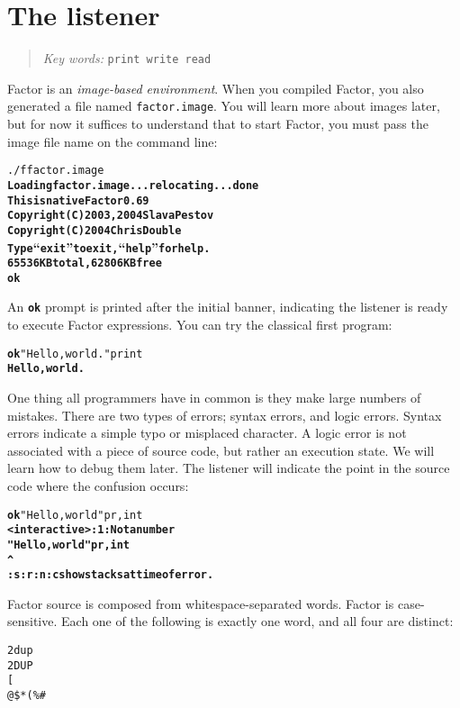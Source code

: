 \documentclass[english]{book}
\newcommand{\chapkeywords}[1]{%
\begin{quote}
\emph{Key words:} \texttt{#1}
\end{quote}
}
\begin{document}
\section{The listener}

\chapkeywords{print write read}

Factor is an \emph{image-based environment}. When you compiled Factor, you also generated a file named \texttt{factor.image}. You will learn more about images later, but for now it suffices to understand that to start Factor, you must pass the image file name on the command line:

\begin{alltt}
./f factor.image
\textbf{Loading factor.image... relocating... done
This is native Factor 0.69
Copyright (C) 2003, 2004 Slava Pestov
Copyright (C) 2004 Chris Double
Type ``exit'' to exit, ``help'' for help.
65536 KB total, 62806 KB free
ok}
\end{alltt}

An \texttt{\textbf{ok}} prompt is printed after the initial banner, indicating the listener is ready to execute Factor expressions. You can try the classical first program:

\begin{alltt}
\textbf{ok} "Hello, world." print
\textbf{Hello, world.}
\end{alltt}

One thing all programmers have in common is they make large numbers of mistakes. There are two types of errors; syntax errors, and logic errors. Syntax errors indicate a simple typo or misplaced character.
A logic error is not associated with a piece of source code, but rather an execution state. We will learn how to debug them later.  The listener will indicate the point in the source code where the confusion occurs:

\begin{alltt}
\textbf{ok} "Hello, world" pr,int
\textbf{<interactive>:1: Not a number
"Hello, world" pr,int
                     ^
:s :r :n :c show stacks at time of error.}
\end{alltt}

Factor source is composed from whitespace-separated words. Factor is case-sensitive. Each one of the following is exactly one word, and all four are distinct:

\begin{verbatim}
2dup
2DUP
[
@$*(%#
\end{verbatim}
\end{document}

